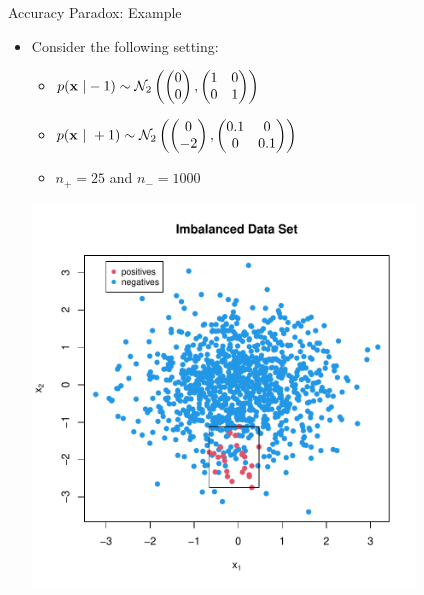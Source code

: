 \documentclass[11pt,compress,t,notes=noshow, xcolor=table]{beamer}
\begin{document}
\begin{vbframe}{Accuracy Paradox: Example}
%
	\footnotesize
	\begin{itemize}
		\item Consider the following setting:
%		

		\begin{minipage}{0.55\textwidth}    
%			
		\begin{itemize}
			\scriptsize
%			
			\item $p(\mathbf{x} ~| -1) \sim \mathcal{N}_2\left( 
			\begin{pmatrix}
				0 \\ 0
			\end{pmatrix}  , 
			\begin{pmatrix}
			1  & 0 \\ 0 & 1
			\end{pmatrix}   \right) $
%		 
			\item  $p(\mathbf{x} ~| ~ +1) \sim \mathcal{N}_2\left( 
			\begin{pmatrix}
				0 \\ -2
			\end{pmatrix}  , 
			\begin{pmatrix}
				0.1  & 0 \\ 0 & 0.1
			\end{pmatrix}   \right)  $
%		
			\item $n_+ = 25$ and $n_- = 1000$
%		
		\end{itemize}
		\end{minipage}
		\begin{minipage}{0.35\textwidth}    
		\begin{center}
			\includegraphics[width=0.8\textwidth]{figure_man/accuracy_paradox}

\end{center}
\end{minipage}
\end{itemize}
\end{vbframe}
\end{document}
